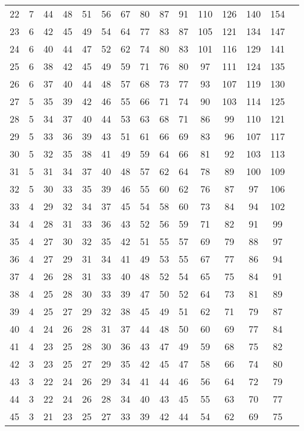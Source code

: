\begin{scriptsize}
\begin{longtable}{c |c |c |c |c |c |c |c |c |c |c |c |c |c |c}
		22 & 7 & 44 & 48 & 51 & 56 & 67 & 80 & 87 & 91 & 110 & 126 & 140 & 154\\
		23 & 6 & 42 & 45 & 49 & 54 & 64 & 77 & 83 & 87 & 105 & 121 & 134 & 147\\
		24 & 6 & 40 & 44 & 47 & 52 & 62 & 74 & 80 & 83 & 101 & 116 & 129 & 141\\
		25 & 6 & 38 & 42 & 45 & 49 & 59 & 71 & 76 & 80 & 97 & 111 & 124 & 135\\
		26 & 6 & 37 & 40 & 44 & 48 & 57 & 68 & 73 & 77 & 93 & 107 & 119 & 130\\
		27 & 5 & 35 & 39 & 42 & 46 & 55 & 66 & 71 & 74 & 90 & 103 & 114 & 125\\
		28 & 5 & 34 & 37 & 40 & 44 & 53 & 63 & 68 & 71 & 86 & 99 & 110 & 121\\
		29 & 5 & 33 & 36 & 39 & 43 & 51 & 61 & 66 & 69 & 83 & 96 & 107 & 117\\
		30 & 5 & 32 & 35 & 38 & 41 & 49 & 59 & 64 & 66 & 81 & 92 & 103 & 113\\
		31 & 5 & 31 & 34 & 37 & 40 & 48 & 57 & 62 & 64 & 78 & 89 & 100 & 109\\
		32 & 5 & 30 & 33 & 35 & 39 & 46 & 55 & 60 & 62 & 76 & 87 & 97 & 106\\
		33 & 4 & 29 & 32 & 34 & 37 & 45 & 54 & 58 & 60 & 73 & 84 & 94 & 102\\
		34 & 4 & 28 & 31 & 33 & 36 & 43 & 52 & 56 & 59 & 71 & 82 & 91 & 99\\
		35 & 4 & 27 & 30 & 32 & 35 & 42 & 51 & 55 & 57 & 69 & 79 & 88 & 97\\
		36 & 4 & 27 & 29 & 31 & 34 & 41 & 49 & 53 & 55 & 67 & 77 & 86 & 94\\
		37 & 4 & 26 & 28 & 31 & 33 & 40 & 48 & 52 & 54 & 65 & 75 & 84 & 91\\
		38 & 4 & 25 & 28 & 30 & 33 & 39 & 47 & 50 & 52 & 64 & 73 & 81 & 89\\
		39 & 4 & 25 & 27 & 29 & 32 & 38 & 45 & 49 & 51 & 62 & 71 & 79 & 87\\
		40 & 4 & 24 & 26 & 28 & 31 & 37 & 44 & 48 & 50 & 60 & 69 & 77 & 84\\
		41 & 4 & 23 & 25 & 28 & 30 & 36 & 43 & 47 & 49 & 59 & 68 & 75 & 82\\
		42 & 3 & 23 & 25 & 27 & 29 & 35 & 42 & 45 & 47 & 58 & 66 & 74 & 80\\
		43 & 3 & 22 & 24 & 26 & 29 & 34 & 41 & 44 & 46 & 56 & 64 & 72 & 79\\
		44 & 3 & 22 & 24 & 26 & 28 & 34 & 40 & 43 & 45 & 55 & 63 & 70 & 77\\
		45 & 3 & 21 & 23 & 25 & 27 & 33 & 39 & 42 & 44 & 54 & 62 & 69 & 75\\

\end{longtable}
\end{scriptsize}
